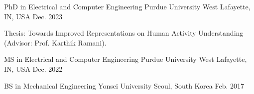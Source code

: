 


\begin{cventries}


    \cventry
    {PhD in Electrical and Computer Engineering} %
    {Purdue University} %
    {West Lafayette, IN, USA} %
    {Dec. 2023} %
    { %
    \begin{cvitems}
        \item {Thesis: Towards Improved Representations on Human Activity Understanding (Advisor: Prof. Karthik Ramani).}
    \end{cvitems}
    }

    \cventry
    {MS in Electrical and Computer Engineering} %
    {Purdue University} %
    {West Lafayette, IN, USA} %
    {Dec. 2022} %
    { %
    }
    \vspace{-1em}

    \cventry
    {BS in Mechanical Engineering} %
    {Yonsei University} %
    {Seoul, South Korea} %
    {Feb. 2017} %
    { %
    }
    \vspace{-1.5em}

\end{cventries}
